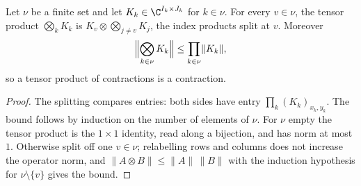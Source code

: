\begin{theorem}
    \label{thm:party_pi_kronecker_norm}
    \leanok
    Let $\nu$ be a finite set and let $K_k\in\C^{I_k\times J_k}$ for
    $k\in\nu$. For every $v\in\nu$, the tensor product $\bigotimes_kK_k$ is
    $K_v\otimes\bigotimes_{j\neq v}K_j$, the index products split at $v$.
    Moreover
    \begin{align}
        \Bigl\lVert\bigotimes_{k\in\nu}K_k\Bigr\rVert
        \le\prod_{k\in\nu}\lVert K_k\rVert,
        \notag
    \end{align}
    so a tensor product of contractions is a contraction.
\end{theorem}

\begin{proof}\leanok
    The splitting compares entries: both sides have entry
    $\prod_k(K_k)_{x_k,y_k}$. The bound follows by induction on the
    number of elements of $\nu$. For $\nu$ empty the tensor product is the
    $1\times1$ identity, read along a bijection, and has norm at most $1$.
    Otherwise split off one $v\in\nu$; relabelling rows and columns does not
    increase the operator norm, and
    $\lVert A\otimes B\rVert\le\lVert A\rVert\,\lVert B\rVert$ with the
    induction hypothesis for $\nu\setminus\{v\}$ gives the bound.
\end{proof}

